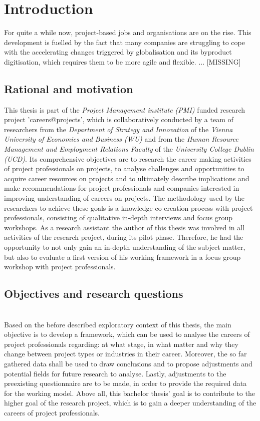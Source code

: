 \cleardoublepage

\section{Introduction}
\label{sec:Introduction}
For quite a while now, project-based jobs and organisations are on the rise. This development is fuelled by the fact that many companies are struggling to cope with the accelerating changes triggered by globalisation and its byproduct digitisation, which requires them to be more agile and flexible. 
... [MISSING]

\subsection{Rational and motivation}
This thesis is part of the \textit{Project Management institute (PMI)} funded research project 'careers@projects', which is collaboratively conducted by a team of researchers from the \textit{Department of Strategy and Innovation} of the \textit{Vienna University of Economics and Business (WU)} and from the \textit{Human Resource Management and Employment Relations Faculty} of the \textit{University College Dublin (UCD)}. Its comprehensive objectives are to research the career making activities of project professionals on projects, to analyse challenges and opportunities to acquire career resources on projects and to ultimately describe implications and make recommendations for project professionals and companies interested in improving understanding of careers on projects. The methodology used by the researchers to achieve these goals is a knowledge co-creation process with project professionals, consisting of qualitative in-depth interviews and focus group workshops. As a research assistant the author of this thesis was involved in all activities of the research project, during its pilot phase. Therefore, he had the opportunity to not only gain an in-depth understanding of the subject matter, but also to evaluate a first version of his working framework in a focus group workshop with project professionals.

\subsection{Objectives and research questions}

\\[.1cm]
Based on the before described exploratory context of this thesis, the  main objective is to develop a framework, which can be used to analyse the careers of project professionals regarding: at what stage, in what matter and why they change between project types or industries in their career. Moreover, the so far gathered data shall be used to draw conclusions and to propose adjustments and potential fields for future research to analyse. Lastly, adjustments to the preexisting questionnaire are to be made, in order to provide the required data for the working model. Above all, this bachelor thesis' goal is to contribute to the higher goal of the research project, which is to gain a deeper understanding of the careers of project professionals.\\

